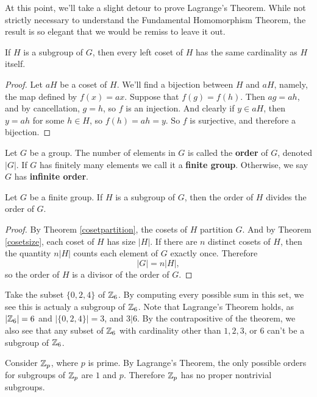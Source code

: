 At this point, we'll take a slight detour to prove Lagrange's Theorem. While not strictly necessary to understand the Fundamental Homomorphism Theorem, the result is so elegant that we would be remiss to leave it out.

\begin{theorem}
\label{cosetsize}
If \extra $H$ is a subgroup of $G$, then every left coset of $H$ has the same cardinality as $H$ itself.
\end{theorem}

\begin{proof}
Let $aH$ be a coset of $H$. We'll find a bijection between $H$ and $aH$, namely, the map defined by $f(x) = ax$. Suppose that $f(g) = f(h)$. Then $ag = ah$, and by cancellation, $g=h$, so $f$ is an injection. And clearly if $y \in aH$, then $y = ah$ for some $h \in H$, so $f(h) = ah = y$. So $f$ is surjective, and therefore a bijection.
\end{proof}

\begin{definition}
Let \extra $G$ be a group. The number of elements in $G$ is called the \textbf{order} of $G$, denoted $|G|$. If $G$ has finitely many elements we call it a \textbf{finite group}. Otherwise, we say $G$ has \textbf{infinite order}.
\end{definition}

\begin{theorem}
Let \extra $G$ be a finite group. If $H$ is a subgroup of $G$, then the order of $H$ divides the order of $G$.
\end{theorem}

\begin{proof}
By Theorem \ref{cosetpartition}, the cosets of $H$ partition $G$. And by Theorem \ref{cosetsize}, each coset of $H$ has size $|H|$. If there are $n$ distinct cosets of $H$, then the quantity $n|H|$ counts each element of $G$ exactly once. Therefore
\begin{equation*}
    |G| = n|H|\mathrm{,}
\end{equation*}
so the order of $H$ is a divisor of the order of $G$.

\end{proof}

\begin{example}
Take the subset $\{0, 2, 4\}$ of $\zn[6]$. By computing every possible sum in this set, we see this is actualy a subgroup of $\zn[6]$. Note that Lagrange's Theorem holds, as $\left|\zn[6]\right| = 6$ and $|\{0, 2, 4\}| = 3$, and $3|6$. By the contrapositive of the theorem, we also see that any subset of $\zn[6]$ with cardinality other than $1, 2, 3$, or $6$ can't be a subgroup of $\zn[6]$.
\end{example}

\begin{example}
Consider $\zn[p]$, where $p$ is prime. By Lagrange's Theorem, the only possible orders for subgroups of $\zn[p]$ are $1$ and $p$. Therefore $\zn[p]$ has no proper nontrivial subgroups.
\end{example}